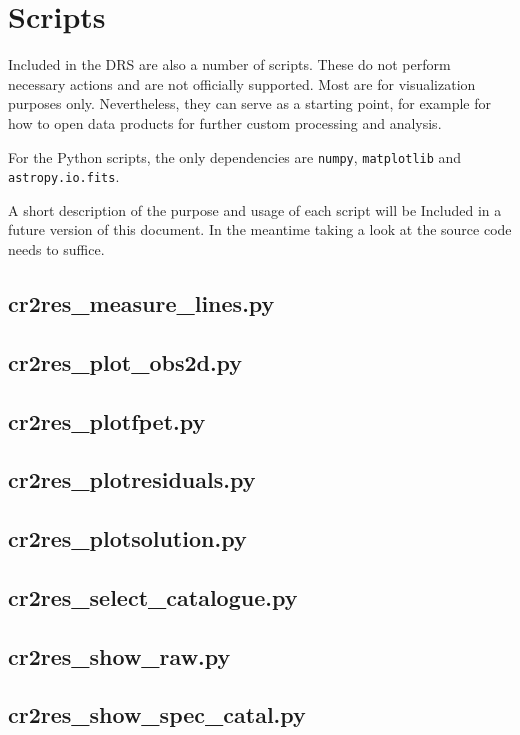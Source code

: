 \section{Scripts}
\label{sec:scripts}

Included in the DRS are also a number of scripts. These do not perform necessary
actions and are not officially supported. Most are for visualization purposes
only. Nevertheless, they can serve as a starting point, for example for how to
open data products for further custom processing and analysis.

For the Python scripts, the only dependencies are \texttt{numpy}, \texttt{matplotlib} and \texttt{astropy.io.fits}.

A short description of the purpose and usage of each script will be Included
in a future version of this document. In the meantime taking a look at the source code needs to suffice.


\subsection{cr2res\_measure\_lines.py}
\subsection{cr2res\_plot\_obs2d.py}
\subsection{cr2res\_plotfpet.py}
\subsection{cr2res\_plotresiduals.py}
\subsection{cr2res\_plotsolution.py}
\subsection{cr2res\_select\_catalogue.py}
\subsection{cr2res\_show\_raw.py}
\subsection{cr2res\_show\_spec\_catal.py}
